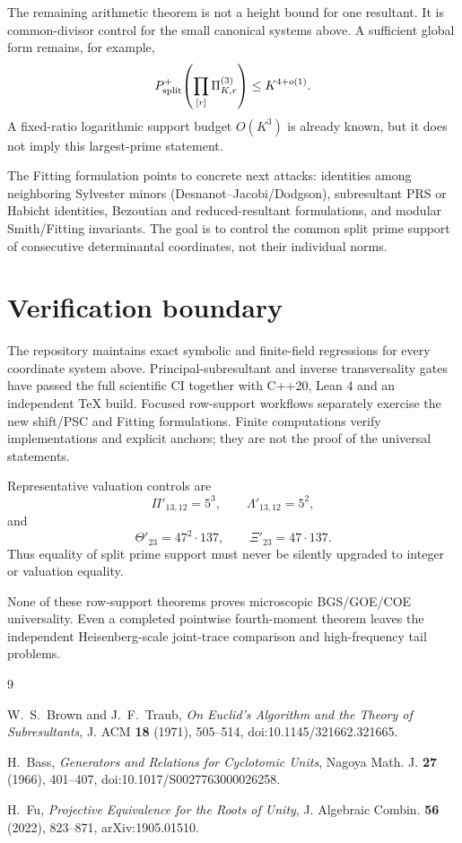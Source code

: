 \documentclass[11pt]{article}
\begin{document}
The remaining arithmetic theorem is not a height bound for one resultant.  It
is common-divisor control for the small canonical systems above.  A sufficient
global form remains, for example,
\[
P^+_{\rm split}\!\left(\prod_{[r]}\Pi_{K,r}^{(3)}\right)
 \le K^{4+o(1)}.
\]
A fixed-ratio logarithmic support budget $O(K^3)$ is already known, but it does
not imply this largest-prime statement.

The Fitting formulation points to concrete next attacks: identities among
neighboring Sylvester minors (Desnanot--Jacobi/Dodgson), subresultant PRS or
Habicht identities, Bezoutian and reduced-resultant formulations, and modular
Smith/Fitting invariants.  The goal is to control the common split prime
support of consecutive determinantal coordinates, not their individual norms.

\section{Verification boundary}

The repository maintains exact symbolic and finite-field regressions for every
coordinate system above.  Principal-subresultant and inverse transversality
gates have passed the full scientific CI together with C++20, Lean 4 and an
independent TeX build.  Focused row-support workflows separately exercise the
new shift/PSC and Fitting formulations.  Finite computations verify
implementations and explicit anchors; they are not the proof of the universal
statements.

Representative valuation controls are
\[
\Pi'_{13,12}=5^3,
\qquad
\Lambda'_{13,12}=5^2,
\]
and
\[
\Theta'_{23}=47^2\cdot137,
\qquad
\Xi'_{23}=47\cdot137.
\]
Thus equality of split prime support must never be silently upgraded to
integer or valuation equality.

None of these row-support theorems proves microscopic BGS/GOE/COE universality.
Even a completed pointwise fourth-moment theorem leaves the independent
Heisenberg-scale joint-trace comparison and high-frequency tail problems.

\begin{thebibliography}{9}

W.~S.~Brown and J.~F.~Traub,
\emph{On Euclid's Algorithm and the Theory of Subresultants},
J. ACM \textbf{18} (1971), 505--514,
doi:10.1145/321662.321665.

H.~Bass,
\emph{Generators and Relations for Cyclotomic Units},
Nagoya Math. J. \textbf{27} (1966), 401--407,
doi:10.1017/S0027763000026258.

H.~Fu,
\emph{Projective Equivalence for the Roots of Unity},
J. Algebraic Combin. \textbf{56} (2022), 823--871,
arXiv:1905.01510.

\end{thebibliography}
\end{document}

